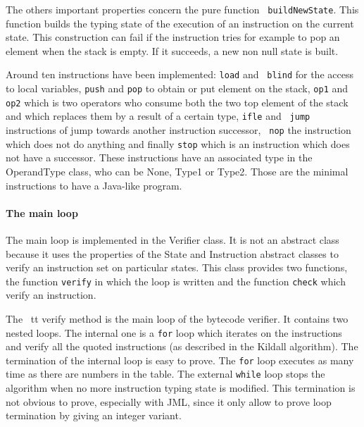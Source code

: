 The others important properties concern the pure function {\tt
buildNewState}.  This function builds the typing state of the
execution of an instruction on the current state.  This construction
can fail if the instruction tries for example to pop an element when
the stack is empty.  If it succeeds, a new non null state is built.


Around ten instructions have been implemented: {\tt load} and {\tt
blind} for the access to local variables, {\tt push} and {\tt pop} to
obtain or put element on the stack, {\tt op1} and {\tt op2} which is
two operators who consume both the two top element of the stack and
which replaces them by a result of a certain type, {\tt ifle} and {\tt
jump} instructions of jump towards another instruction successor, {\tt
nop} the instruction which does not do anything and finally {\tt stop}
which is an instruction which does not have a successor.  These
instructions have an associated type in the OperandType class, who can
be None, Type1 or Type2.  Those are the minimal instructions to have a
Java-like program.

\paragraph {The main loop}
The main loop is implemented in the Verifier class.  It is not an
abstract class because it uses the properties of the State and
Instruction abstract classes to verify an instruction set on
particular states.  This class provides two functions, the function
{\tt verify} in which the loop is written and the function {\tt check}
which verify an instruction.


The {\ tt verify} method is the main loop of the bytecode verifier.
It contains two nested loops. The internal one is a {\tt for} loop
which iterates on the instructions and verify all the quoted
instructions (as described in the Kildall algorithm). The termination
of the internal loop is easy to prove.  The {\tt for} loop executes as
many time as there are numbers in the table.  The external {\tt while}
loop stops the algorithm when no more instruction typing state is
modified.  This termination is not obvious to prove, especially with
JML, since it only allow to prove loop termination by giving an
integer variant.

